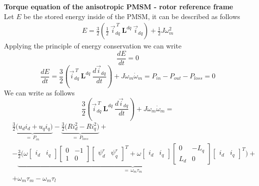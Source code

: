 \documentclass[11pt,a4paper,oneside]{book}
\numberwithin{equation}{section}
\theoremstyle{it}
\theoremstyle{definition}
\begin{document}
\textbf{Torque equation of the anisotropic PMSM - rotor reference frame}\\
Let $E$ be the stored energy inside of the PMSM, it can be described as 
follows
\begin{equation*}
	\begin{aligned}
		E = \frac{3}{2} \left(\frac{1}{2}\ \vec{i}_{dq}^{\ T}\ 
		\mathbf{L}^{dq}\ \vec{i}_{dq}\right) +\frac{1}{2}J\omega_m^2
	\end{aligned} 
\end{equation*}
Applying the principle of energy conservation we can write
\begin{equation*}
	\frac{dE}{dt} = 0
\end{equation*}
\begin{equation*}
	\frac{dE}{dt} = \frac{3}{2} \left( \vec{i}_{dq}^{\ T}\ \mathbf{L}^{dq}\ 
	\frac{d\vec{i}_{dq}}{dt}\right) + J\omega_m\dot{\omega}_m= 
	P_{in}-P_{out}-P_{loss} = 0
\end{equation*}
We can write as follows
\begin{equation*}
	\frac{3}{2} \left( \vec{i}_{dq}^{\ T}\ \mathbf{L}^{dq}\ 
	\frac{d\vec{i}_{dq}}{dt}\right) + J\omega_m\dot{\omega}_m =
\end{equation*}
\begin{equation*}
	\begin{aligned}
		&\underbrace{\frac{3}{2}\Big(u_d i_d+u_q 
			i_q\Big)}_{=\,P_{in}}-\underbrace{\frac{3}{2}\Big(Ri_d^2-Ri_q^2\Big)}_{=\,P_{loss}}
		+ \\[6pt]
		&-\underbrace{\frac{3}{2}\Big(\omega 
			\begin{bmatrix} i_d & i_q \end{bmatrix}
			\begin{bmatrix} 0 & -1 \\ 1 & 0\end{bmatrix}
			\begin{bmatrix} \psi^r_d & \psi^r_q \end{bmatrix}^T
			+\omega 
			\begin{bmatrix} i_d & i_q \end{bmatrix}
			\begin{bmatrix} 0 & -L_q \\ L_d & 0\end{bmatrix}
			\begin{bmatrix} i_d & i_q \end{bmatrix}^T\Big)
		}_{=\,\omega_m\tau_m} + \\[6pt]
		& +\omega_m\tau_m-\omega_m\tau_l
	\end{aligned}
\end{equation*}
\end{document}
